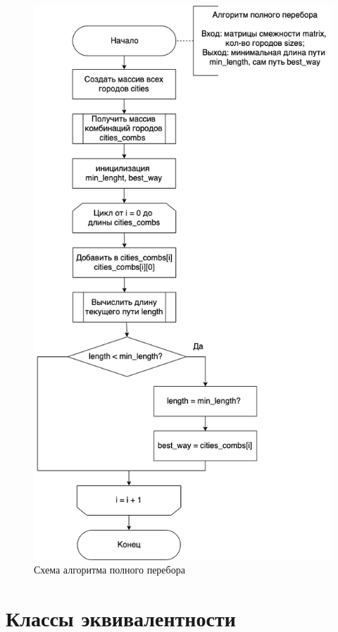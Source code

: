 \documentclass[a4paper,14pt, unknownkeysallowed]{extreport}
\begin{document}
\begin{figure}[h]
	\centering
	\includegraphics[scale=0.6]{img/full_comb_alg_scheme.png}
	\caption{Схема алгоритма полного перебора}
	\label{fig:full_comb_alg_scheme}
\end{figure}

\clearpage

\section{Классы эквивалентности}
\end{document}
